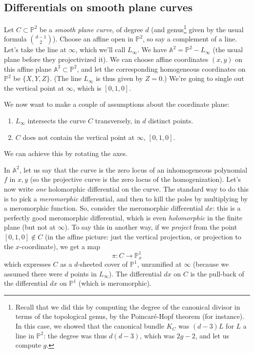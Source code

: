 \documentclass[12pt]{article}
\begin{document}
\subsection{Differentials on smooth plane curves}
Let $C \subset \mathbb{P}^2$ be a \textit{smooth plane curve}, of degree $d$ (and genus\footnote{Recall that we did this by computing the degree of the canonical divisor in terms of the topological genus, by the Poincaré-Hopf theorem (for instance). In this case, we showed that the canonical bundle $K_C$ was $(d-3)L$ for $L$ a line in $\mathbb{P}^2$: the degree was thus $d(d-3)$, which was $2g-2$, and let us compute $g$.} given by the usual formula $\binom{d-1}{2}$). Choose an affine open in $\mathbb{P}^2$, so say a complement of a line. Let's take the line at $\infty$, which we'll call $L_\infty$. We have $\mathbb{A}^2 = \mathbb{P}^2 - L_\infty$ (the usual plane before they projectivized it). We can choose affine coordinates $(x,y)$ on this affine plane $\mathbb{A}^2 \subset \mathbb{P}^2$, and let the corresponding homogeneous coordinates on $\mathbb{P}^2$ be $\{X, Y, Z\}$. (The line $L_\infty$ is thus given by $Z = 0$.) We're going to single out the vertical point at $\infty$, which is $[0, 1, 0]$.

We now want to make a couple of assumptions about the coordinate plane:

\begin{enumerate}
\item $L_\infty$ intersects the curve $C$ transversely, in $d$ distinct points.

\item $C$ does not contain the vertical point at $\infty$, $[0, 1, 0]$.
\end{enumerate}

We can achieve this by rotating the axes.

In $\mathbb{A}^2$, let us say that the curve is the zero locus of an inhomogeneous polynomial $f$ in $x, y$ (so the projective curve is the zero locus of the homogenization). Let's now write \textit{one} holomorphic differential on the curve. The standard way to do this is to pick a \textit{meromorphic} differential, and then to kill the poles by multiplying by a meromorphic function. So, consider the meromorphic differential $dx$: this is a perfectly good meromorphic differential, which is even \textit{holomorphic} in the finite plane (but not at $\infty$). To say this in another way, if we \textit{project} from the point $[0, 1, 0] \notin C$ (in the affine picture: just the vertical projection, or projection to the $x$-coordinate), we get a map
$$\pi : C \to \mathbb{P}^1_x$$
which expresses $C$ as a $d$-sheeted cover of $\mathbb{P}^1$, unramified at $\infty$ (because we assumed there were $d$ points in $L_\infty$). The differential $dx$ on $C$ is the pull-back of the differential $dx$ on $\mathbb{P}^1$ (which is meromorphic).
\end{document}
